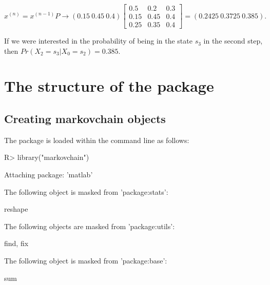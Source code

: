 \documentclass[
  nojss]{jss}
\begin{document}
\begin{equation}
x^{(n)}=x^{(n-1)}P \to \left(0.15\:0.45\:0.4\right)\left[\begin{array}{ccc}
0.5 & 0.2 & 0.3\\
0.15 & 0.45 & 0.4\\
0.25 & 0.35 & 0.4
\end{array}\right]=\left(0.2425\:0.3725\:0.385\right).
\label{eq:trPropExEx3}
\end{equation}

If we were interested in the probability of being in the state \(s_{3}\) in the second step, then \(Pr\left(X_{2}=s_{3}\left|X_{0}=s_{2}\right.\right)=0.385\).

\newpage

\hypertarget{sec:structure}{%
\section{The structure of the package}\label{sec:structure}}

\hypertarget{creating-markovchain-objects}{%
\subsection{Creating markovchain objects}\label{creating-markovchain-objects}}

The package is loaded within the  command line as follows:

\begin{CodeChunk}

\begin{CodeInput}
R> library("markovchain")
\end{CodeInput}
\end{CodeChunk}

\begin{CodeChunk}

\begin{CodeOutput}

Attaching package: 'matlab'
\end{CodeOutput}

\begin{CodeOutput}
The following object is masked from 'package:stats':

    reshape
\end{CodeOutput}

\begin{CodeOutput}
The following objects are masked from 'package:utils':

    find, fix
\end{CodeOutput}

\begin{CodeOutput}
The following object is masked from 'package:base':

    sum
\end{CodeOutput}
\end{CodeChunk}
\end{document}
